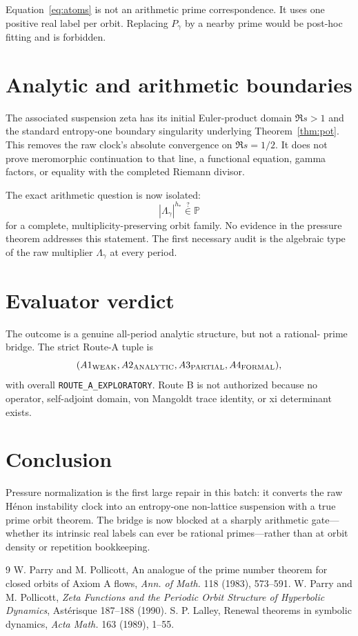 \documentclass[11pt]{article}
\theoremstyle{remark}\newtheorem{remark}[theorem]{Remark}
\begin{document}
Equation~\eqref{eq:atoms} is not an arithmetic prime correspondence.  It
uses one positive real label per orbit.  Replacing $P_\gamma$ by a nearby
prime would be post-hoc fitting and is forbidden.

\section{Analytic and arithmetic boundaries}
The associated suspension zeta has its initial Euler-product domain
$\Re s>1$ and the standard entropy-one boundary singularity underlying
Theorem~\ref{thm:pot}.  This removes the raw clock's absolute convergence on
$\Re s=1/2$.  It does not prove meromorphic continuation to that line, a
functional equation, gamma factors, or equality with the completed Riemann
divisor.

The exact arithmetic question is now isolated:
\[
\boxed{|\Lambda_\gamma|^{h_*}\stackrel{?}{\in}\mathbb P}
\]
for a complete, multiplicity-preserving orbit family.  No evidence in the
pressure theorem addresses this statement.  The first necessary audit is
the algebraic type of the raw multiplier $\Lambda_\gamma$ at every period.

\section{Evaluator verdict}
The outcome is a genuine all-period analytic structure, but not a rational-
prime bridge.  The strict Route-A tuple is
\[
(A1_{\rm WEAK},A2_{\rm ANALYTIC},A3_{\rm PARTIAL},A4_{\rm FORMAL}),
\]
with overall \texttt{ROUTE\_A\_EXPLORATORY}.  Route B is not authorized
because no operator, self-adjoint domain, von Mangoldt trace identity, or xi
determinant exists.

\section{Conclusion}
Pressure normalization is the first large repair in this batch: it converts
the raw H\'enon instability clock into an entropy-one non-lattice suspension
with a true prime orbit theorem.  The bridge is now blocked at a sharply
arithmetic gate---whether its intrinsic real labels can ever be rational
primes---rather than at orbit density or repetition bookkeeping.

\begin{thebibliography}{9}
W. Parry and M. Pollicott, An analogue of the prime number theorem for closed
orbits of Axiom A flows, \emph{Ann. of Math.} 118 (1983), 573--591.
W. Parry and M. Pollicott, \emph{Zeta Functions and the Periodic Orbit
Structure of Hyperbolic Dynamics}, Ast\'erisque 187--188 (1990).
S. P. Lalley, Renewal theorems in symbolic dynamics, \emph{Acta Math.} 163
(1989), 1--55.
\end{thebibliography}
\end{document}
